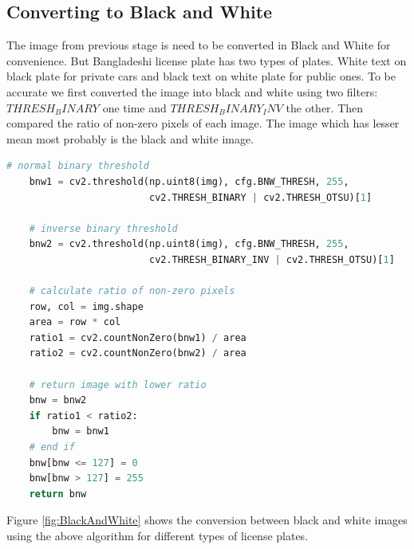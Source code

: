 \documentclass{standalone}
\begin{document}
\subsection{Converting to Black and White}
The image from previous stage is need to be converted in Black and White for convenience. But Bangladeshi license plate has two types of plates. White text on black plate for private cars and black text on white plate for public ones. To be accurate we first converted the image into black and white using two filters: $THRESH_BINARY$ one time and $THRESH_BINARY_INV$ the other. Then compared the ratio of non-zero pixels of each image. The image which has lesser mean most probably is the black and white image. 
\begin{lstlisting}[language=Python]
    # normal binary threshold
    bnw1 = cv2.threshold(np.uint8(img), cfg.BNW_THRESH, 255,
                         cv2.THRESH_BINARY | cv2.THRESH_OTSU)[1]

    # inverse binary threshold
    bnw2 = cv2.threshold(np.uint8(img), cfg.BNW_THRESH, 255,
                         cv2.THRESH_BINARY_INV | cv2.THRESH_OTSU)[1]

    # calculate ratio of non-zero pixels
    row, col = img.shape
    area = row * col
    ratio1 = cv2.countNonZero(bnw1) / area
    ratio2 = cv2.countNonZero(bnw2) / area

    # return image with lower ratio
    bnw = bnw2
    if ratio1 < ratio2:
        bnw = bnw1
    # end if
    bnw[bnw <= 127] = 0
    bnw[bnw > 127] = 255
    return bnw
\end{lstlisting}

Figure \ref{fig:BlackAndWhite} shows the conversion between black and white images using the above algorithm for different types of license plates.
\end{document}
